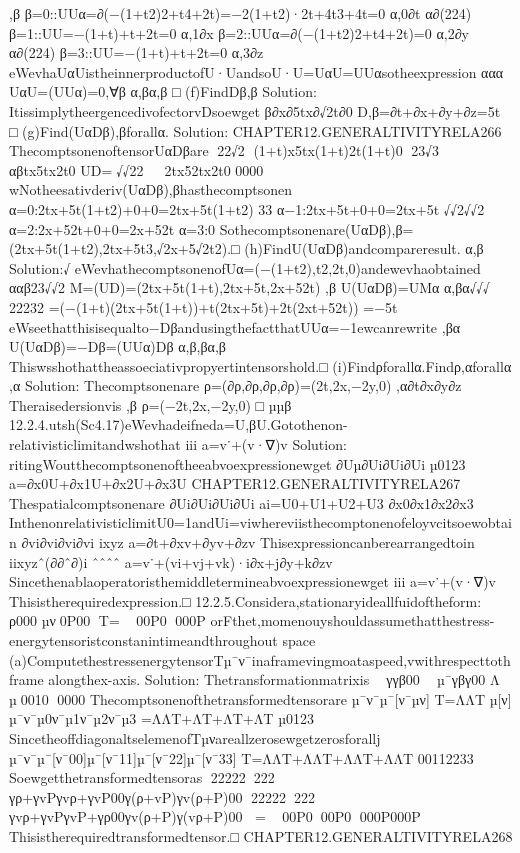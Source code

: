 {{{{{{{{{{{{{{{{,β
β=0::UUα=∂(−(1+t2)2+t4+2t)=−2(1+t2)·2t+4t3+4t=0
α,0∂t
α∂(224)
β=1::UU=−(1+t)+t+2t=0
α,1∂x
β=2::UUα=∂(−(1+t2)2+t4+2t)=0
α,2∂y
α∂(224)
β=3::UU=−(1+t)+t+2t=0
α,3∂z
eWevhaUαUistheinnerproductofU·UandsoU·U=UαU=UUαsotheexpression
ααα
UαU=(UUα)=0,∀β
α,βα,β
□
(f)FindDβ,β
Solution:
ItissimplytheergencedivofectorvDsoewget
β∂x∂5tx∂√2t∂0
D,β=∂t+∂x+∂y+∂z=5t
□
(g)Find(UαDβ),βforallα.
Solution:
CHAPTER12.GENERALTIVITYRELA266
ThecomptsonenoftensorUαDβare
22√2
(1+t)x5tx(1+t)2t(1+t)0
23√3
αβtx5tx2t0
UD=√√22

2tx52tx2t0
0000
wNotheesativderiv(UαDβ),βhasthecomptsonen
α=0:2tx+5t(1+t2)+0+0=2tx+5t(1+t2)
33
α−1:2tx+5t+0+0=2tx+5t
√√2√√2
α=2:2x+52t+0+0=2x+52t
α=3:0
Sothecomptsonenare(UαDβ),β=(2tx+5t(1+t2),2tx+5t3,√2x+5√2t2).□
(h)FindU(UαDβ)andcompareresult.
α,β
Solution:√
eWevhathecomptsonenofUα=(−(1+t2),t2,2t,0)andewevhaobtained
ααβ23√√2
M=(UD)=(2tx+5t(1+t),2tx+5t,2x+52t)
,β
U(UαDβ)=UMα
α,βα√√√
22232
=(−(1+t)(2tx+5t(1+t))+t(2tx+5t)+2t(2xt+52t))
=−5t
eWseethatthisisequalto−DβandusingthefactthatUUα=−1ewcanrewrite
,βα
U(UαDβ)=−Dβ=(UUα)Dβ
α,β,βα,β
Thiswsshothattheassoeciativpropyertintensorshold.□
(i)Findρforallα.Findρ,αforallα
,α
Solution:
Thecomptsonenare
ρ=(∂ρ,∂ρ,∂ρ,∂ρ)=(2t,2x,−2y,0)
,α∂t∂x∂y∂z
Theraisedersionvis
,β
ρ=(−2t,2x,−2y,0)
□
µµβ
12.2.4.utsh(Sc4.17)eWevhadeifneda=U,βU.Gotothenon-relativisticlimitandwshothat
iii
a=v˙+(v·∇)v
Solution:
ritingWoutthecomptsonenoftheeabvoexpressionewget
∂Uµ∂Ui∂Ui∂Ui
µ0123
a=∂x0U+∂x1U+∂x2U+∂x3U
CHAPTER12.GENERALTIVITYRELA267
Thespatialcomptsonenare
∂Ui∂Ui∂Ui∂Ui
ai=U0+U1+U2+U3
∂x0∂x1∂x2∂x3
InthenonrelativisticlimitU0=1andUi=viwhereviisthecomptonenofeloyvcitsoewobtain
∂vi∂vi∂vi∂vi
ixyz
a=∂t+∂xv+∂yv+∂zv
Thisexpressioncanberearrangedtoin
iixyzˆ(∂∂ˆ∂)i
ˆˆˆˆ
a=v˙+(vi+vj+vk)·i∂x+j∂y+k∂zv
Sincethenablaoperatoristhemiddletermineabvoexpressionewget
iii
a=v˙+(v·∇)v
Thisistherequiredexpression.□
12.2.5.Considera,stationaryideallfuidoftheform:

ρ000
µν0P00
T=
00P0
000P
orFthet,momenouyshouldassumethatthestress-energytensoristconstanintimeandthroughout
space
(a)ComputethestressenergytensorTµ¯ν¯inaframevingmoataspeed,vwithrespecttothframe
alongthex-axis.
Solution:
Thetransformationmatrixis

γγβ00

µ¯γβγ00
Λ
µ0010
0000
Thecomptsonenofthetransformedtensorare
µ¯ν¯µ¯[ν¯µν]
T=ΛΛT
µ[ν]
µ¯ν¯µ0ν¯µ1ν¯µ2ν¯µ3
=ΛΛT+ΛT+ΛT+ΛT
µ0123
SincetheoffdiagonaltselemenofTµνareallzerosewgetzerosforallj
µ¯ν¯µ¯[ν¯00]µ¯[ν¯11]µ¯[ν¯22]µ¯[ν¯33]
T=ΛΛT+ΛΛT+ΛΛT+ΛΛT
00112233
Soewgetthetransformedtensoras
22222222
γρ+γvPγvρ+γvP00γ(ρ+vP)γv(ρ+P)00
22222222
γvρ+γvPγvP+γρ00γv(ρ+P)γ(vρ+P)00
=
00P000P0
000P000P
Thisistherequiredtransformedtensor.□
CHAPTER12.GENERALTIVITYRELA268
}}}}}}}}}}}}}}}}
